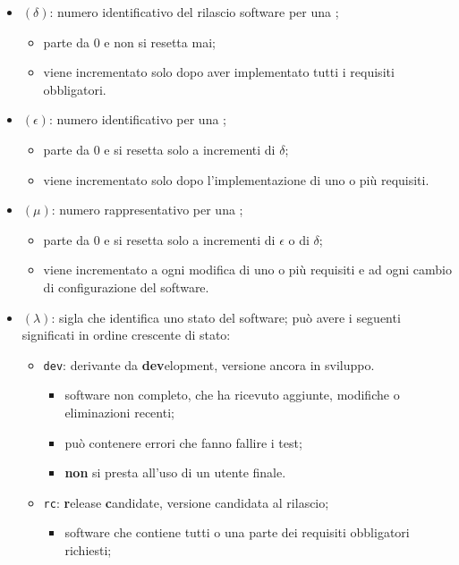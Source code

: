 		\begin{itemize}
			\item \((\delta)\): numero identificativo del rilascio software per una ;
			\begin{itemize}
				\item parte da 0 e non si resetta mai;
				\item viene incrementato solo dopo aver implementato tutti i requisiti obbligatori.
			\end{itemize}
			\item \((\epsilon)\): numero identificativo per una ;
			\begin{itemize}
				\item parte da 0 e si resetta solo a incrementi di \(\delta\);
				\item viene incrementato solo dopo l'implementazione di uno o più requisiti.
			\end{itemize}
			\item \((\mu)\): numero rappresentativo per una ;
			\begin{itemize}
				\item parte da 0 e si resetta solo a incrementi di \(\epsilon\) o di \(\delta\);
				\item viene incrementato a ogni modifica di uno o più requisiti e ad ogni cambio di configurazione del software. 
			\end{itemize}
			\item \((\lambda)\): sigla che identifica uno stato del software; può avere i seguenti significati in ordine crescente di stato:
			\begin{itemize}
				\item \verb!dev!: derivante da \textbf{dev}elopment, versione ancora in sviluppo.
					\begin{itemize}
						\item software non completo, che ha ricevuto aggiunte, modifiche o eliminazioni recenti;
						\item può contenere errori che fanno fallire i test;
						\item \textbf{non} si presta all'uso di un utente finale.
					\end{itemize}
				\item \verb!rc!: \textbf{r}elease \textbf{c}andidate, versione candidata al rilascio;
				\begin{itemize}
					\item software che contiene tutti o una parte dei requisiti obbligatori richiesti;

\end{itemize}
\end{itemize}
\end{itemize}
